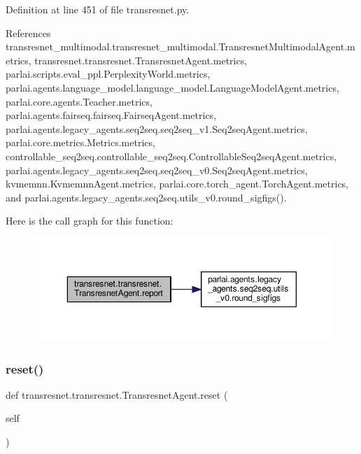 Definition at line 451 of file transresnet.\+py.



References transresnet\+\_\+multimodal.\+transresnet\+\_\+multimodal.\+Transresnet\+Multimodal\+Agent.\+metrics, transresnet.\+transresnet.\+Transresnet\+Agent.\+metrics, parlai.\+scripts.\+eval\+\_\+ppl.\+Perplexity\+World.\+metrics, parlai.\+agents.\+language\+\_\+model.\+language\+\_\+model.\+Language\+Model\+Agent.\+metrics, parlai.\+core.\+agents.\+Teacher.\+metrics, parlai.\+agents.\+fairseq.\+fairseq.\+Fairseq\+Agent.\+metrics, parlai.\+agents.\+legacy\+\_\+agents.\+seq2seq.\+seq2seq\+\_\+v1.\+Seq2seq\+Agent.\+metrics, parlai.\+core.\+metrics.\+Metrics.\+metrics, controllable\+\_\+seq2seq.\+controllable\+\_\+seq2seq.\+Controllable\+Seq2seq\+Agent.\+metrics, parlai.\+agents.\+legacy\+\_\+agents.\+seq2seq.\+seq2seq\+\_\+v0.\+Seq2seq\+Agent.\+metrics, kvmemnn.\+Kvmemnn\+Agent.\+metrics, parlai.\+core.\+torch\+\_\+agent.\+Torch\+Agent.\+metrics, and parlai.\+agents.\+legacy\+\_\+agents.\+seq2seq.\+utils\+\_\+v0.\+round\+\_\+sigfigs().

Here is the call graph for this function\+:
\nopagebreak
\begin{figure}[H]
\begin{center}
\leavevmode
\includegraphics[width=350pt]{classtransresnet_1_1transresnet_1_1TransresnetAgent_ae3c93bd69572f26004acde7002b31f55_cgraph}
\end{center}
\end{figure}
\mbox{\label{classtransresnet_1_1transresnet_1_1TransresnetAgent_ab8b5db45162f69898d1396eeab72e470}} 
\subsubsection{\texorpdfstring{reset()}{reset()}}
{\footnotesize\ttfamily def transresnet.\+transresnet.\+Transresnet\+Agent.\+reset (\begin{DoxyParamCaption}\item[{}]{self }\end{DoxyParamCaption})}

